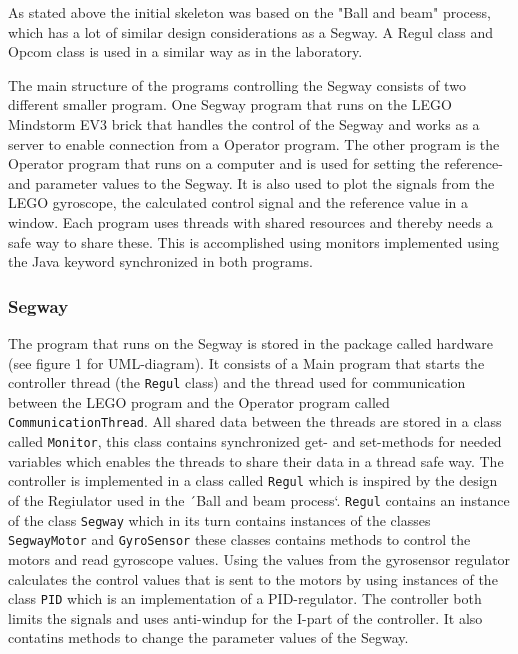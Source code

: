 As stated above the initial skeleton was based on the "Ball and beam" process, which has a lot of similar design considerations as a Segway. A Regul class and Opcom class is used in a similar way as in the laboratory.

The main structure of the programs controlling the Segway consists of two different smaller program. One Segway program that runs on the LEGO Mindstorm EV3 brick that handles the control of the Segway and works as a server to enable connection from a Operator program. The other program is the Operator program that runs on a computer and is used for setting the reference- and parameter values to the Segway. It is also used to plot the signals from the LEGO gyroscope, the calculated control signal and the reference value in a window. Each program uses threads with shared resources and thereby needs a safe way to share these. This is accomplished using monitors implemented using the Java keyword synchronized in both programs.


\subsubsection{Segway}
The program that runs on the Segway is stored in the package called hardware (see figure 1 for UML-diagram). It consists of a Main program that starts the controller thread (the \texttt{Regul} class) and the thread used for communication between the LEGO program and the Operator program called \texttt{CommunicationThread}. All shared data between the threads are stored in a class called \texttt{Monitor}, this class contains synchronized get- and set-methods for needed variables which enables the threads to share their data in a thread safe way. The controller is implemented in a class called \texttt{Regul} which is inspired by the design of the Regiulator used in the ´Ball and beam process`. \texttt{Regul} contains an instance of the class \texttt{Segway} which in its turn contains instances of the classes \texttt{SegwayMotor} and \texttt{GyroSensor} these classes contains methods to control the motors and read gyroscope values. Using the values from the gyrosensor regulator calculates the control values that is sent to the motors by using instances of the class \texttt{PID} which is an implementation of a PID-regulator. The controller both limits the signals and uses anti-windup for the I-part of the controller. It also contatins methods to change the parameter values of the Segway.


